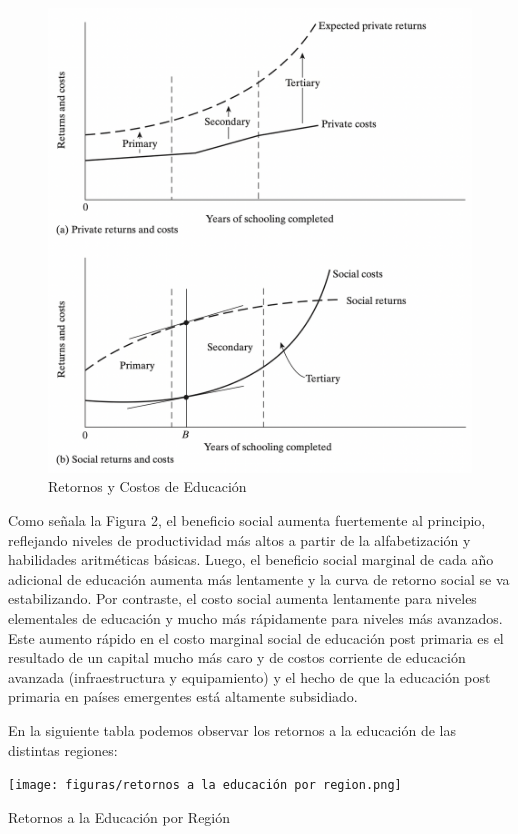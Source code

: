 \documentclass[a4paper]{article}
\theoremstyle{plain}
\theoremstyle{definition}
\begin{document}
\begin{figure}[h]
    \centering
    \includegraphics[scale=0.3]{figuras/costo-beneficio educarse.png}
    \caption{Retornos y Costos de Educación}
    \label{fig:my_label}
\end{figure}


Como señala la Figura 2, el beneficio social aumenta fuertemente al principio, reflejando niveles de productividad más altos a partir de la alfabetización y habilidades aritméticas básicas. Luego, el beneficio social marginal de cada año adicional de educación aumenta más lentamente y la curva de retorno social se va estabilizando. Por contraste, el costo social aumenta lentamente para niveles elementales de educación y mucho más rápidamente para niveles más avanzados. Este aumento rápido en el costo marginal social de educación post primaria es el resultado de un capital mucho más caro y de costos corriente de educación avanzada (infraestructura y equipamiento) y el hecho de que la educación post primaria en países emergentes está altamente subsidiado. 

En la siguiente tabla podemos observar los retornos a la educación de las distintas regiones: 

\begin{table}[h]
    \centering
    \texttt{[image: figuras/retornos a la educación por region.png]}
    \caption{Retornos a la Educación por Región}
    \label{fig:retornos_por_region}
\end{table}
\end{document}
